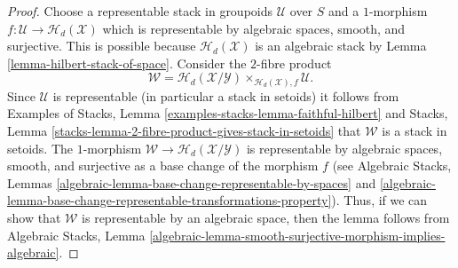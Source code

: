 \begin{proof}
Choose a representable stack in groupoids $\mathcal{U}$ over $S$ and a
$1$-morphism $f : \mathcal{U} \to \mathcal{H}_d(\mathcal{X})$
which is representable by algebraic spaces, smooth, and surjective.
This is possible because $\mathcal{H}_d(\mathcal{X})$ is an algebraic stack by
Lemma \ref{lemma-hilbert-stack-of-space}.
Consider the $2$-fibre product
$$
\mathcal{W} =
\mathcal{H}_d(\mathcal{X}/\mathcal{Y})
\times_{\mathcal{H}_d(\mathcal{X}), f}
\mathcal{U}.
$$
Since $\mathcal{U}$ is representable (in particular a stack in setoids)
it follows from
Examples of Stacks, Lemma \ref{examples-stacks-lemma-faithful-hilbert}
and
Stacks, Lemma \ref{stacks-lemma-2-fibre-product-gives-stack-in-setoids}
that $\mathcal{W}$ is a stack in setoids. The $1$-morphism
$\mathcal{W} \to \mathcal{H}_d(\mathcal{X}/\mathcal{Y})$ is
representable by algebraic spaces, smooth, and surjective as a base
change of the morphism $f$ (see
Algebraic Stacks,
Lemmas \ref{algebraic-lemma-base-change-representable-by-spaces} and
\ref{algebraic-lemma-base-change-representable-transformations-property}).
Thus, if we can show that $\mathcal{W}$ is representable by an algebraic space,
then the lemma follows from
Algebraic Stacks,
Lemma \ref{algebraic-lemma-smooth-surjective-morphism-implies-algebraic}.


\end{proof}
